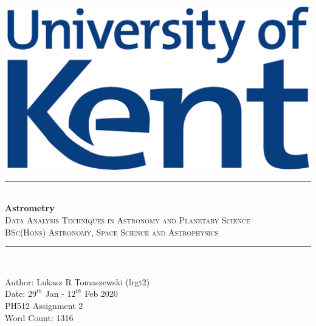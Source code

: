 \documentclass[12pt]{article}
\title{}
\begin{document}
\begin{titlepage}
\newcommand{\HRule}{\rule{\linewidth}{0.5mm}}
\begin{centering} 

\includegraphics[scale=0.7]{Images/Uni_of_Kent.png}\\[0.3cm]
\HRule \\ [0.3cm]
\Huge{\bfseries{Astrometry}} \\
\textsc{\large Data Analysis Techniques in Astronomy and Planetary Science}\\ [-0.1cm]
\textsc{\large BSc(Hons) Astronomy, Space Science and Astrophysics}\\ [-0.2cm]
\HRule \\[0.5cm]
\begin{minipage}{0.625\textwidth}
\begin{center} \large
{\large Author: Lukasz R Tomaszewski (lrgt2)} \\[0.2cm]
{\large Date: $29^{th}$ Jan - $12^{th}$ Feb 2020}\\[0.2cm]
{\large PH512 Assignment 2} \\[0.2cm]
{\large Word Count: 1316} \\
\end{center}
\end{minipage}\\[1cm]
\end{centering} 
\begin{tableofcontents}
\end{tableofcontents}
\end{titlepage}
\newpage
\end{document}

